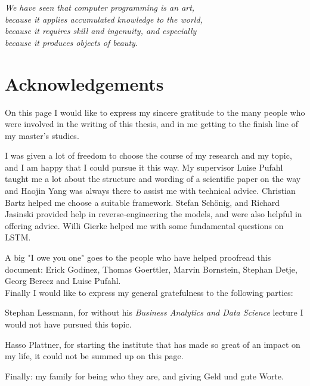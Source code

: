 
\begin{flushright}{\slshape
We have seen that computer programming is an art, \\
because it applies accumulated knowledge to the world, \\
because it requires skill and ingenuity, and especially \\
because it produces objects of beauty.} \\ \medskip
\end{flushright}

\bigskip


\begingroup

\let\clearpage\relax
\let\cleardoublepage\relax
\let\cleardoublepage\relax

\chapter*{Acknowledgements}
On this page I would like to express my sincere gratitude to the many people who were involved
in the writing of this thesis, and in me getting to the finish line of my master's studies.

I was given a lot of freedom to choose the course of my research and my topic,
and I am happy that I could pursue it this way. My supervisor Luise Pufahl
taught me a lot about the structure and wording of a scientific paper on the way
and Haojin Yang was always there to assist me with technical advice.
Christian Bartz helped me choose a suitable framework.
Stefan Schönig, and Richard Jasinski provided help in reverse-engineering the models,
and were also helpful in offering advice.
Willi Gierke helped me with some fundamental questions on LSTM.

A big "I owe you one" goes to the people who have helped proofread this document:
Erick Godínez, Thomas Goerttler, Marvin Bornstein, Stephan Detje, Georg Berecz and Luise Pufahl.\\

Finally I would like to express my general gratefulness to the following parties:

Stephan Lessmann, for without his \textit{Business Analytics and Data Science} lecture I would not have pursued this topic.

Hasso Plattner, for starting the institute that has made so great of an impact on my life, it could not be summed up on this page.

Finally: my family for being who they are, and giving Geld und gute Worte.
\endgroup
